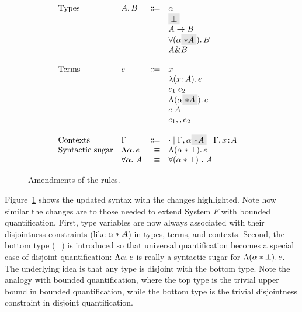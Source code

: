 \begin{figure}
  \[
    \begin{array}{l}
      \begin{array}{llrll}
        \text{Types}
        & A, B & \Coloneqq & \alpha                  & \\
        &      & \mid & \highlight {$\bot$}          & \\
        &      & \mid & A \to B                      & \\
        &      & \mid & \for {(\alpha \highlight {$\disjoint A$})} B  & \\
        &      & \mid & A \inter B                   & \\

        \\
        \text{Terms}
        & e & \Coloneqq & x                        & \\
        &   & \mid & \lam {(x \oftype A)} e          & \\
        &   & \mid & \app {e_1} {e_2}              & \\
        &   & \mid & \blam {(\alpha \highlight {$\disjoint A$})} e  & \\
        &   & \mid & \tapp e A                     & \\
        &   & \mid & e_1 \mergeop e_2              & \\

        \\
        \text{Contexts}
        & \Gamma & \Coloneqq & \cdot
                   \mid \Gamma, \alpha \highlight {$\disjoint A$}
                   \mid \Gamma, x \oftype A  & \\

        \text{Syntactic sugar} & \blam \alpha e & \equiv & \blamdis \alpha \bot e & \\
                               & \forall \alpha.~A & \equiv & \forall (\alpha * \bot)~.~A & \\
      \end{array}
    \end{array}
  \]

  \caption{Amendments of the rules.}
  \label{fig:fi-syntax-dis}
\end{figure}

Figure~\ref{fig:fi-syntax-dis} shows the updated syntax with the
changes highlighted.  Note how similar the changes are to those needed
to extend System $F$ with bounded quantification. First, type
variables are now always associated with their disjointness
constraints (like $\alpha * A$) in types, terms, and
contexts. Second, the bottom type ($\bot$) is introduced so that
universal quantification becomes a special case of disjoint
quantification: $\Lambda \alpha.\, e$ is really a syntactic sugar for
$\Lambda (\alpha * \bot).\, e$. The underlying idea is that any type is
disjoint with the bottom type.  Note the analogy with bounded
quantification, where the top type is the trivial upper bound in
bounded quantification, while the bottom type is the trivial
disjointness constraint in disjoint quantification.

